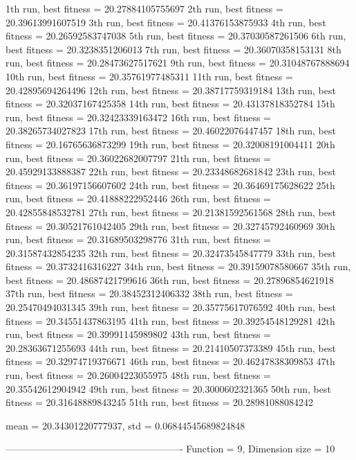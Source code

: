 1th run, best fitness = 20.27884105755697
2th run, best fitness = 20.39613991607519
3th run, best fitness = 20.41376153875933
4th run, best fitness = 20.26592583747038
5th run, best fitness = 20.37030587261506
6th run, best fitness = 20.3238351206013
7th run, best fitness = 20.36070358153131
8th run, best fitness = 20.28473627517621
9th run, best fitness = 20.31048767888694
10th run, best fitness = 20.35761977485311
11th run, best fitness = 20.42895694264496
12th run, best fitness = 20.38717759319184
13th run, best fitness = 20.32037167425358
14th run, best fitness = 20.43137818352784
15th run, best fitness = 20.32423339163472
16th run, best fitness = 20.38265734027823
17th run, best fitness = 20.46022076447457
18th run, best fitness = 20.16765636873299
19th run, best fitness = 20.32008191004411
20th run, best fitness = 20.36022682007797
21th run, best fitness = 20.45929133888387
22th run, best fitness = 20.23348682681842
23th run, best fitness = 20.36197156607602
24th run, best fitness = 20.36469175628622
25th run, best fitness = 20.41888222952446
26th run, best fitness = 20.42855848532781
27th run, best fitness = 20.21381592561568
28th run, best fitness = 20.30521761042405
29th run, best fitness = 20.32745792460969
30th run, best fitness = 20.31689503298776
31th run, best fitness = 20.31587432854235
32th run, best fitness = 20.32473545847779
33th run, best fitness = 20.3732416316227
34th run, best fitness = 20.39159078580667
35th run, best fitness = 20.48687421799616
36th run, best fitness = 20.27896854621918
37th run, best fitness = 20.38452312406332
38th run, best fitness = 20.25470494031345
39th run, best fitness = 20.35775617076592
40th run, best fitness = 20.34551437863195
41th run, best fitness = 20.39254548129281
42th run, best fitness = 20.39991145989802
43th run, best fitness = 20.28363671255693
44th run, best fitness = 20.21410507373389
45th run, best fitness = 20.32974719376671
46th run, best fitness = 20.46247838309853
47th run, best fitness = 20.26004223055975
48th run, best fitness = 20.35542612904942
49th run, best fitness = 20.3000602321365
50th run, best fitness = 20.31648889843245
51th run, best fitness = 20.28981088084242

mean = 20.34301220777937, std = 0.06844545689824848

-------------------------------------------------------
Function = 9, Dimension size = 10

